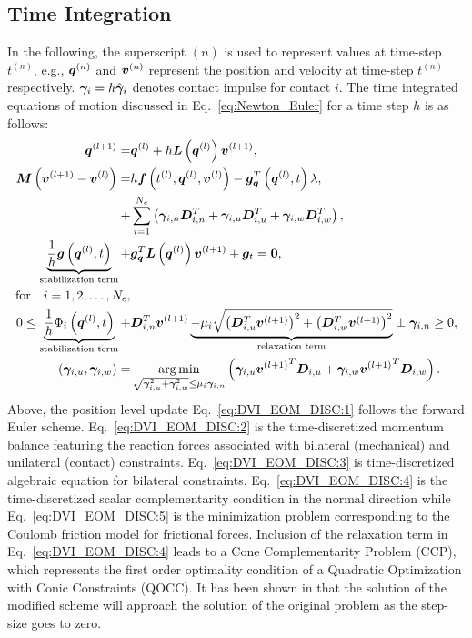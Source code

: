 \subsection{Time Integration}
In the following, the superscript $(n)$ is used to represent values at time-step $t^{(n)}$, e.g.,  $\boldsymbol{q}^{(n)}$ and $\boldsymbol{v}^{(n)}$ represent the position and velocity at time-step $t^{(n)}$ respectively.
$\boldsymbol{\gamma}_i=h\hat{\boldsymbol{\gamma}}_i$ denotes contact impulse for contact $i$. The time integrated equations of motion discussed in Eq.~\ref{eq:Newton_Euler} for a time step $h$ is as follows:
\begin{align}
\boldsymbol{q}^{(l+1)}=&\boldsymbol{q}^{(l)}+h \boldsymbol{L}\left(\boldsymbol{q}^{(l)}\right)\boldsymbol{v}^{(l+1)} \label{eq:DVI_EOM_DISC:1},\\
\boldsymbol{M}\left(\boldsymbol{v}^{(l+1)}-\boldsymbol{v}^{(l)}\right)=&h \boldsymbol{f}\left(t^{(l)},\boldsymbol{q}^{(l)},\boldsymbol{v}^{(l)}\right)-\boldsymbol{g}_{\boldsymbol{q}}^T\left(\boldsymbol{q}^{(l)},t\right)\lambda, \nonumber \\
+&\sum\limits_{i=1}^{N_c} \left( \boldsymbol{\gamma}_{i,n} \boldsymbol{D}_{i,n}^T + \boldsymbol{\gamma}_{i,u} \boldsymbol{D}_{i,u}^T + \boldsymbol{\gamma}_{i,w} \boldsymbol{D}_{i,w}^T \right),\label{eq:DVI_EOM_DISC:2}\\
\underbrace{\frac{1}{h}\boldsymbol{g}\left(\boldsymbol{q}^{(l)},t\right)}_{\text{stabilization term}}+&\boldsymbol{g}_{\boldsymbol{q}}^T\boldsymbol{L}\left(\boldsymbol{q}^{(l)}\right)\boldsymbol{v}^{(l+1)}+\boldsymbol{g}_t=\boldsymbol{0} \label{eq:DVI_EOM_DISC:3},\\
\text{for} \quad i=1,2,\ldots,N_c, \nonumber\\
0 \leq \underbrace{\frac{1}{h}\Phi_i\left(\boldsymbol{q}^{(l)},t\right)}_{\text{stabilization term}}+&\boldsymbol{D}_{i,n}^T\boldsymbol{v}^{(l+1)}  \underbrace{-\mu_i \sqrt{\left(\boldsymbol{D}_{i,u}^T\boldsymbol{v}^{(l+1)}\right)^2+\left(\boldsymbol{D}_{i,w}^T\boldsymbol{v}^{(l+1)}\right)^2} }_{\text{relaxation term}}\perp \boldsymbol{\gamma}_{i,n} \geq 0, \label{eq:DVI_EOM_DISC:4}\\
\left(\boldsymbol{\gamma}_{i,u},\boldsymbol{\gamma}_{i,w}\right)=&\operatorname*{arg\,min}_{\sqrt{\boldsymbol{\gamma}_{i,u}^2+\boldsymbol{\gamma}_{i,w}^2}\leq \mu_i\boldsymbol{\gamma}_{i,n}} \left(\boldsymbol{\gamma}_{i,u}{\boldsymbol{v}^{(l+1)}}^T \boldsymbol{D}_{i,u}+\boldsymbol{\gamma}_{i,w} {\boldsymbol{v}^{(l+1)}}^T \boldsymbol{D}_{i,w}\right) \label{eq:DVI_EOM_DISC:5}.
\end{align}
Above, the position level update Eq.~\ref{eq:DVI_EOM_DISC:1} follows the forward Euler scheme. Eq.~\ref{eq:DVI_EOM_DISC:2} is the time-discretized momentum balance featuring the reaction forces associated with bilateral (mechanical) and unilateral (contact) constraints.  Eq.~\ref{eq:DVI_EOM_DISC:3} is time-discretized algebraic equation for bilateral constraints. Eq.~\ref{eq:DVI_EOM_DISC:4} is the time-discretized scalar complementarity condition in the normal direction while Eq.~\ref{eq:DVI_EOM_DISC:5} is the minimization problem corresponding to the Coulomb friction model for frictional forces. Inclusion of the relaxation term in Eq.~\ref{eq:DVI_EOM_DISC:4} leads to a Cone Complementarity Problem (CCP), which represents the first order optimality condition of a Quadratic Optimization with Conic Constraints (QOCC). It has been shown in \cite{ani04} that the solution of the modified scheme will approach the solution of the original problem as the step-size goes to zero.
